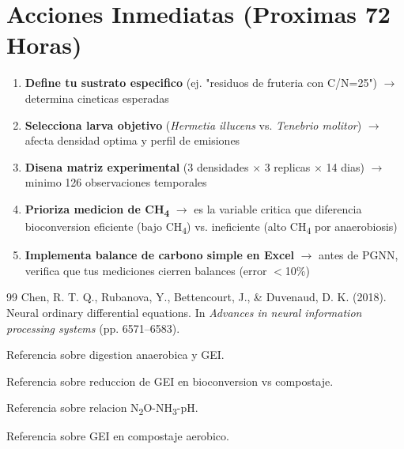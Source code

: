 \documentclass[12pt]{article}
\begin{document}
\newpage

\section{Acciones Inmediatas (Proximas 72 Horas)}

\begin{enumerate}
\item \textbf{Define tu sustrato especifico} (ej. "residuos de fruteria con C/N=25") $\rightarrow$ determina cineticas esperadas
\item \textbf{Selecciona larva objetivo} (\textit{Hermetia illucens} vs. \textit{Tenebrio molitor}) $\rightarrow$ afecta densidad optima y perfil de emisiones
\item \textbf{Disena matriz experimental} (3 densidades $\times$ 3 replicas $\times$ 14 dias) $\rightarrow$ minimo 126 observaciones temporales
\item \textbf{Prioriza medicion de CH\textsubscript{4}} $\rightarrow$ es la variable critica que diferencia bioconversion eficiente (bajo CH\textsubscript{4}) vs. ineficiente (alto CH\textsubscript{4} por anaerobiosis)
\item \textbf{Implementa balance de carbono simple en Excel} $\rightarrow$ antes de PGNN, verifica que tus mediciones cierren balances (error $<$10\%)
\end{enumerate}

\newpage

\begin{thebibliography}{99}
 Chen, R. T. Q., Rubanova, Y., Bettencourt, J., \& Duvenaud, D. K. (2018). Neural ordinary differential equations. In \textit{Advances in neural information processing systems} (pp. 6571--6583).

 Referencia sobre digestion anaerobica y GEI.

 Referencia sobre reduccion de GEI en bioconversion vs compostaje.

 Referencia sobre relacion N\textsubscript{2}O-NH\textsubscript{3}-pH.

 Referencia sobre GEI en compostaje aerobico.
\end{thebibliography}
\end{document}
